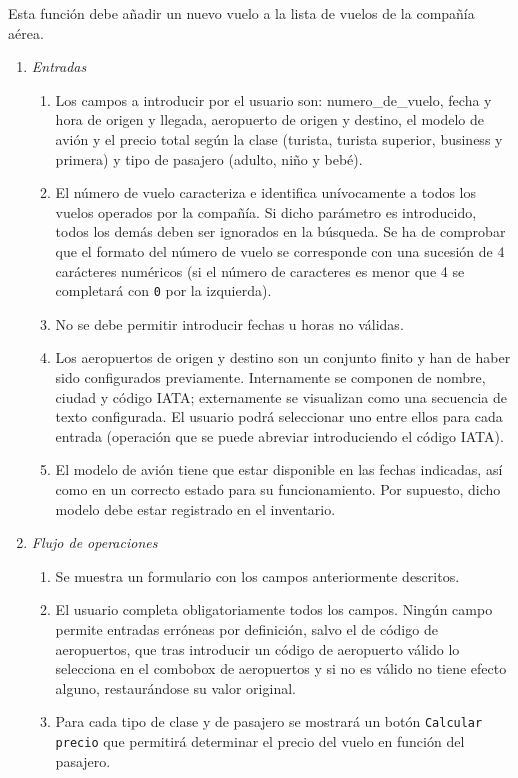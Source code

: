 	Esta función debe añadir un nuevo vuelo a la lista de vuelos de la compañía aérea.

	\begin{enumerate}
		\item \textit{Entradas}
			\begin{enumerate}
				\item Los campos a introducir por el usuario son: \gls{numero_de_vuelo}, fecha y hora de origen y llegada, aeropuerto de origen y destino, el modelo de avión y el  precio total según la clase (turista, turista superior, business y primera) y tipo de pasajero (adulto, niño y bebé).
				\item El número de vuelo caracteriza e identifica unívocamente a todos los vuelos operados por la compañía. Si dicho parámetro es introducido, todos los demás deben ser ignorados en la búsqueda. Se ha de comprobar que el formato del número de vuelo se corresponde con una sucesión de 4 carácteres numéricos (si el número de caracteres es menor que 4 se completará con \verb|0| por la izquierda).
				\item No se debe permitir introducir fechas u horas no válidas.
				\item Los aeropuertos de origen y destino son un conjunto finito y han de haber sido configurados previamente. Internamente se componen de nombre, ciudad y código \gls{IATA}; externamente se visualizan como una secuencia de texto configurada. El usuario podrá seleccionar uno entre ellos para cada entrada (operación que se puede abreviar introduciendo el código IATA).
				\item El modelo de avión tiene que estar disponible en las fechas indicadas, así como en un correcto estado para su funcionamiento. Por supuesto, dicho modelo debe estar registrado en el inventario.
			\end{enumerate}
		\item \textit{Flujo de operaciones}
			\begin{enumerate}
				\item Se muestra un formulario con los campos anteriormente descritos.
				\item El usuario completa obligatoriamente todos los campos. Ningún campo permite entradas erróneas por definición, salvo el de código de aeropuertos, que tras introducir un código de aeropuerto válido lo selecciona en el \gls{combobox} de aeropuertos y si no es válido no tiene efecto alguno, restaurándose su valor original.
				\item Para cada tipo de clase y de pasajero se mostrará un botón \verb|Calcular precio| que permitirá determinar el precio del vuelo en función del pasajero.

\end{enumerate}
\end{enumerate}
